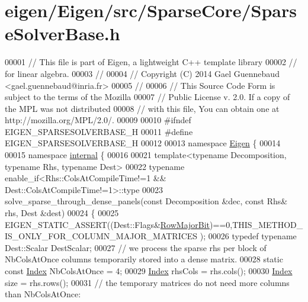 \hypertarget{eigen_2_eigen_2src_2_sparse_core_2_sparse_solver_base_8h_source}{}\section{eigen/\+Eigen/src/\+Sparse\+Core/\+Sparse\+Solver\+Base.h}
\label{eigen_2_eigen_2src_2_sparse_core_2_sparse_solver_base_8h_source}

\begin{DoxyCode}
00001 \textcolor{comment}{// This file is part of Eigen, a lightweight C++ template library}
00002 \textcolor{comment}{// for linear algebra.}
00003 \textcolor{comment}{//}
00004 \textcolor{comment}{// Copyright (C) 2014 Gael Guennebaud <gael.guennebaud@inria.fr>}
00005 \textcolor{comment}{//}
00006 \textcolor{comment}{// This Source Code Form is subject to the terms of the Mozilla}
00007 \textcolor{comment}{// Public License v. 2.0. If a copy of the MPL was not distributed}
00008 \textcolor{comment}{// with this file, You can obtain one at http://mozilla.org/MPL/2.0/.}
00009 
00010 \textcolor{preprocessor}{#ifndef EIGEN\_SPARSESOLVERBASE\_H}
00011 \textcolor{preprocessor}{#define EIGEN\_SPARSESOLVERBASE\_H}
00012 
00013 \textcolor{keyword}{namespace }\hyperlink{namespace_eigen}{Eigen} \{ 
00014 
00015 \textcolor{keyword}{namespace }\hyperlink{namespaceinternal}{internal} \{
00016 
00021 \textcolor{keyword}{template}<\textcolor{keyword}{typename} Decomposition, \textcolor{keyword}{typename} Rhs, \textcolor{keyword}{typename} Dest>
00022 \textcolor{keyword}{typename} enable\_if<Rhs::ColsAtCompileTime!=1 && Dest::ColsAtCompileTime!=1>::type
00023 solve\_sparse\_through\_dense\_panels(\textcolor{keyword}{const} Decomposition &dec, \textcolor{keyword}{const} Rhs& rhs, Dest &dest)
00024 \{
00025   EIGEN\_STATIC\_ASSERT((Dest::Flags&\hyperlink{group__flags_gae4f56c2a60bbe4bd2e44c5b19cbe8762}{RowMajorBit})==0,THIS\_METHOD\_IS\_ONLY\_FOR\_COLUMN\_MAJOR\_MATRICES
      );
00026   \textcolor{keyword}{typedef} \textcolor{keyword}{typename} Dest::Scalar DestScalar;
00027   \textcolor{comment}{// we process the sparse rhs per block of NbColsAtOnce columns temporarily stored into a dense matrix.}
00028   \textcolor{keyword}{static} \textcolor{keyword}{const} \hyperlink{namespace_eigen_a62e77e0933482dafde8fe197d9a2cfde}{Index} NbColsAtOnce = 4;
00029   \hyperlink{namespace_eigen_a62e77e0933482dafde8fe197d9a2cfde}{Index} rhsCols = rhs.cols();
00030   \hyperlink{namespace_eigen_a62e77e0933482dafde8fe197d9a2cfde}{Index} size = rhs.rows();
00031   \textcolor{comment}{// the temporary matrices do not need more columns than NbColsAtOnce:}

\end{DoxyCode}
